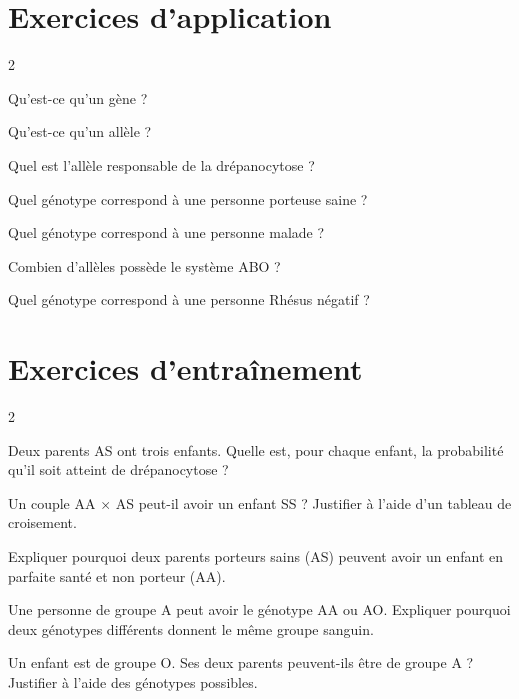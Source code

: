 \section{Exercices d'application}
\begin{multicols}{2}

\exo{} Qu'est-ce qu'un gène ?

\exo{} Qu'est-ce qu'un allèle ?

\exo{} Quel est l'allèle responsable de la drépanocytose ?

\exo{} Quel génotype correspond à une personne porteuse saine ?

\exo{} Quel génotype correspond à une personne malade ?

\exo{} Combien d'allèles possède le système ABO ?

\exo{} Quel génotype correspond à une personne Rhésus négatif ?

\end{multicols}

\section{Exercices d'entraînement}
\begin{multicols}{2}

\exo{} Deux parents AS ont trois enfants. Quelle est, pour chaque enfant, la
probabilité qu'il soit atteint de drépanocytose ?

\exo{} Un couple AA $\times$ AS peut-il avoir un enfant SS ? Justifier à l'aide
d'un tableau de croisement.

\exo{} Expliquer pourquoi deux parents porteurs sains (AS) peuvent avoir un
enfant en parfaite santé et non porteur (AA).

\exo{} Une personne de groupe A peut avoir le génotype AA ou AO. Expliquer
pourquoi deux génotypes différents donnent le même groupe sanguin.

\exo{} Un enfant est de groupe O. Ses deux parents peuvent-ils être de groupe A
? Justifier à l'aide des génotypes possibles.

\end{multicols}

